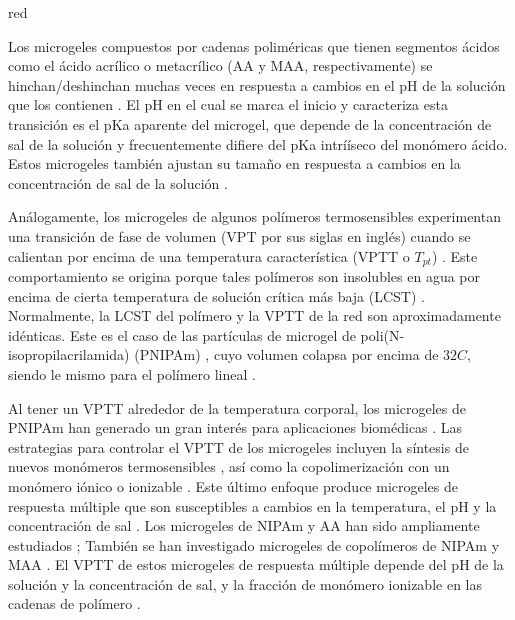 \begin{color}{red}
	
	Los microgeles compuestos por cadenas polim\'ericas que tienen segmentos \'acidos como el \'acido acr\'ilico o metacr\'ilico (AA y MAA, respectivamente) se hinchan/deshinchan muchas veces en respuesta a cambios en el pH de la soluci\'on que los contienen \cite{snowden1996colloidal}.
	El pH en el cual se marca el inicio y caracteriza esta transici\'on es el pKa aparente del microgel, que depende de la concentraci\'on de sal de la soluci\'on y frecuentemente difiere del pKa intrí\'iseco del mon\'omero \'acido.
	Estos microgeles tambi\'en ajustan su tama\~no en respuesta a cambios en la concentraci\'on de sal de la soluci\'on \cite{snowden1996colloidal}.
	
	An\'alogamente, los microgeles de algunos pol\'imeros termosensibles experimentan una transici\'on de fase de volumen (VPT por sus siglas en ingl\'es) cuando se calientan por encima de una temperatura caracter\'istica (VPTT o $T_{pt}$) \cite{Pelton1986,Pelton2000}.
	Este comportamiento se origina porque tales pol\'imeros son insolubles en agua por encima de cierta temperatura de soluci\'on cr\'itica m\'as baja (LCST) \cite{Kawaguchi2020}.
	Normalmente, la LCST del pol\'imero y la VPTT de la red  son aproximadamente id\'enticas. 
	Este es el caso de las part\'iculas de microgel de poli(N-isopropilacrilamida) (PNIPAm) \cite{Pelton1986}, cuyo volumen colapsa por encima de $32 C$, siendo le mismo para el  pol\'imero lineal \cite{Schild1992}.
	
	Al tener un VPTT alrededor de la temperatura corporal, los microgeles de PNIPAm han generado un gran inter\'es para aplicaciones biom\'edicas \cite{Guan2011}.
	Las estrategias para controlar el VPTT de los microgeles incluyen la s\'intesis de nuevos mon\'omeros termosensibles  \cite{Cai2007,Macchione2019}, as\'i como la copolimerizaci\'on con un mon\'omero i\'onico o ionizable  \cite{Hirose1987,Lopez2020}.
	Este \'ultimo enfoque produce microgeles de respuesta m\'ultiple que son susceptibles a cambios en la temperatura, el pH y la concentraci\'on de sal  \cite{snowden1996colloidal, Farooqi2017}.
	Los microgeles de NIPAm y AA han sido ampliamente estudiados \cite{Morris1997, Jones2000,Bradley2005,Begum2016};
	Tambi\'en se han investigado microgeles de copol\'imeros de NIPAm y MAA  \cite{Dowding2000,Hoare2004,Giussi2015}.
	El VPTT de estos microgeles de respuesta m\'ultiple depende del pH de la soluci\'on y la concentraci\'on de sal, y la fracci\'on de mon\'omero ionizable en las cadenas de pol\'imero  \cite{Morris1997,Jones2000, Hoare2004, Bradley2005, Lee2008,Wong2009,Hamzavi2016}.
\end{color}


